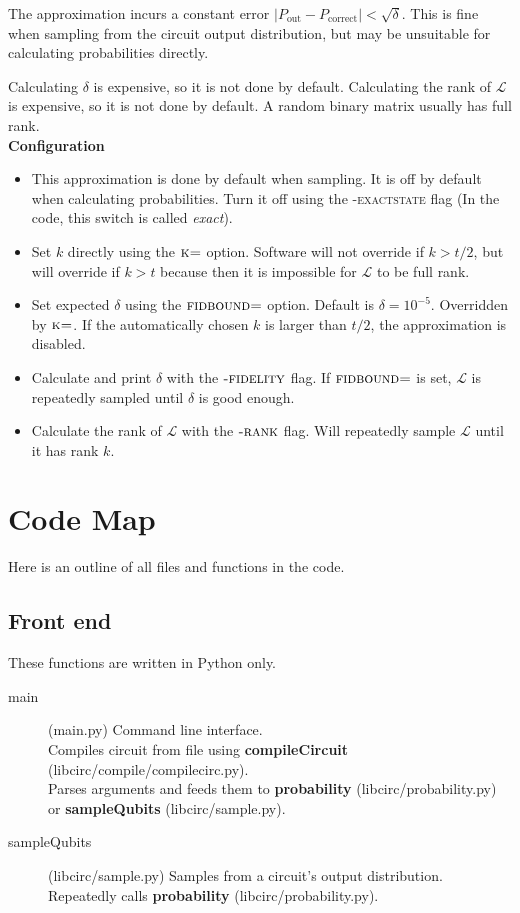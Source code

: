 \documentclass[11pt]{article}
\begin{document}
The approximation incurs a constant error $\left|P_\text{out} - P_\text{correct}\right| < \sqrt{\delta}$. This is fine when sampling from the circuit output distribution, but may be unsuitable for calculating probabilities directly.

Calculating $\delta$ is expensive, so it is not done by default. Calculating the rank of $\mathcal{L}$ is expensive, so it is not done by default. A random binary matrix usually has full rank.\\

\noindent \textbf{Configuration}
\begin{itemize}
    \item This approximation is done by default when sampling. It is off by default when calculating probabilities. Turn it off using the \textsc{-exactstate} flag (In the code, this switch is called \textit{exact}).
    \item Set $k$ directly using the $\textsc{k=}$ option. Software will not override if $k > t/2$, but will override if $k>t$ because then it is impossible for $\mathcal{L}$ to be full rank.
    \item Set expected $\delta$ using the $\textsc{fidbound=}$ option. Default is $\delta = 10^{-5}$. Overridden by $\textsc{k=}$. If the automatically chosen $k$ is larger than $t/2$, the approximation is disabled.
    \item Calculate and print $\delta$ with the $\textsc{-fidelity}$ flag. If $\textsc{fidbound=}$ is set, $\mathcal{L}$ is repeatedly sampled until $\delta$ is good enough.
    \item Calculate the rank of $\mathcal{L}$ with the $\textsc{-rank}$ flag. Will repeatedly sample $\mathcal{L}$ until it has rank $k$.
\end{itemize}

\section{Code Map}

Here is an outline of all files and functions in the code.

\subsection{Front end}
These functions are written in Python only.

\begin{description}
    \item[main] (main.py) Command line interface.\\ Compiles circuit from file using \textbf{compileCircuit} (libcirc/compile/compilecirc.py).\\ Parses arguments and feeds them to \textbf{probability} (libcirc/probability.py)\\ or \textbf{sampleQubits} (libcirc/sample.py).
    \item[sampleQubits] (libcirc/sample.py) Samples from a circuit's output distribution.\\
        Repeatedly calls \textbf{probability} (libcirc/probability.py).
\end{description}
\end{document}
